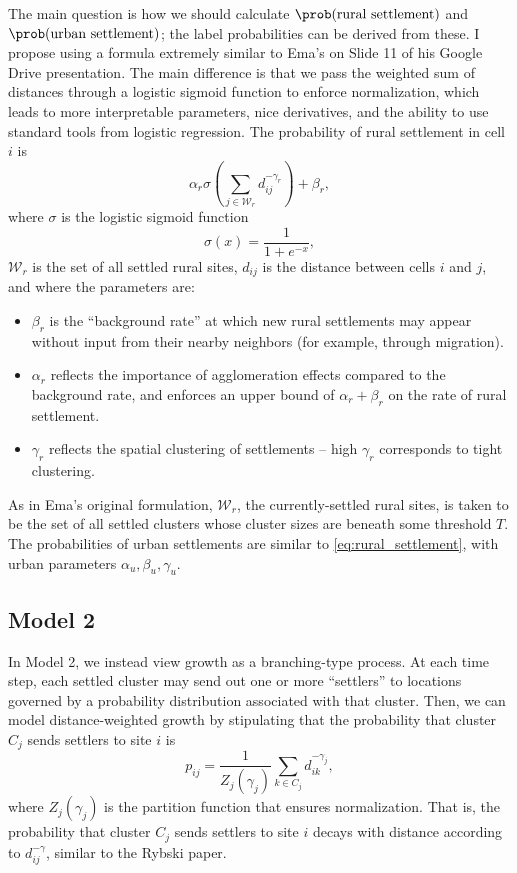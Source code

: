 \documentclass[english]{scrartcl}
\begin{document}
		The main question is how we should calculate $\prob(\text{rural settlement})$ and $\prob(\text{urban settlement})$; the label probabilities can be derived from these. 
		I propose using a formula extremely similar to Ema's on Slide 11 of his Google Drive presentation. 
		The main difference is that we pass the weighted sum of distances through a logistic sigmoid function to enforce normalization, which leads to more interpretable parameters, nice derivatives, and the ability to use standard tools from logistic regression. 
		The probability of rural settlement in cell $i$  is 
		\begin{equation}
			\alpha_{r} \sigma \left( \sum_{j \in \mathcal{W}_r} d_{ij}^{-\gamma_r} \right) + \beta_r, \label{eq:rural_settlement}
		\end{equation}
		where $\sigma$ is the logistic sigmoid function 
		\begin{equation}
			\sigma(x) = \frac{1}{1 + e^{-x}},
		\end{equation}
		$\mathcal{W}_r$ is the set of all settled rural sites, $d_{ij}$ is the distance between cells $i$ and $j$, and where the parameters are:
		\begin{itemize}
			\item $\beta_r$ is the ``background rate'' at which new rural settlements may appear without input from their nearby neighbors (for example, through migration).
			\item $\alpha_r$ reflects the importance of agglomeration effects compared to the background rate, and enforces an upper bound of $\alpha_r + \beta_r$ on the rate of rural settlement. 
			\item $\gamma_r$ reflects the spatial clustering of settlements -- high $\gamma_r$ corresponds to tight clustering. 
		\end{itemize}
		As in Ema's original formulation, $\mathcal{W}_r$, the currently-settled rural sites, is taken to be the set of all settled clusters whose cluster sizes are beneath some threshold $T$. 
		The probabilities of urban settlements are similar to \eqref{eq:rural_settlement}, with urban parameters $\alpha_u, \beta_u, \gamma_u$. 

	\subsection*{Model 2}
		In Model 2, we instead view growth as a branching-type process. 
		At each time step, each settled cluster may send out one or more ``settlers'' to locations governed by a probability distribution associated with that cluster. 
		Then, we can model distance-weighted growth by stipulating that the probability that cluster $C_j$ sends settlers to site $i$ is 
		\begin{equation}
			p_{ij} = \frac{1}{Z_j(\gamma_j)} \sum_{k \in C_j} d_{ik}^{-\gamma_j},
		\end{equation}
		where $Z_j(\gamma_j)$ is the partition function that ensures normalization. 
		That is, the probability that cluster $C_j$ sends settlers to site $i$ decays with distance according to $d_{ij}^{-\gamma}$, similar to the Rybski paper. 
\end{document}

